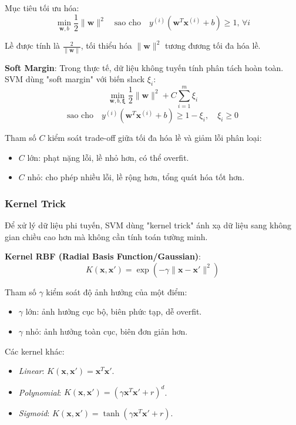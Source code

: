 ﻿\documentclass{article}
\begin{document}
Mục tiêu tối ưu hóa:
\begin{equation}
\min_{\mathbf{w}, b} \frac{1}{2}\|\mathbf{w}\|^2 \quad \text{sao cho} \quad y^{(i)}(\mathbf{w}^T\mathbf{x}^{(i)} + b) \geq 1, \, \forall i
\end{equation}

Lề được tính là $\frac{2}{\|\mathbf{w}\|}$, tối thiểu hóa $\|\mathbf{w}\|^2$ tương đương tối đa hóa lề.

\textbf{Soft Margin}: Trong thực tế, dữ liệu không tuyến tính phân tách hoàn toàn. SVM dùng "soft margin" với biến slack $\xi_i$:
\begin{equation}
\min_{\mathbf{w}, b, \boldsymbol{\xi}} \frac{1}{2}\|\mathbf{w}\|^2 + C\sum_{i=1}^{m}\xi_i
\end{equation}
\begin{equation}
\text{sao cho} \quad y^{(i)}(\mathbf{w}^T\mathbf{x}^{(i)} + b) \geq 1 - \xi_i, \quad \xi_i \geq 0
\end{equation}

Tham số $C$ kiểm soát trade-off giữa tối đa hóa lề và giảm lỗi phân loại:
\begin{itemize}
    \item $C$ lớn: phạt nặng lỗi, lề nhỏ hơn, có thể overfit.
    \item $C$ nhỏ: cho phép nhiều lỗi, lề rộng hơn, tổng quát hóa tốt hơn.
\end{itemize}

\subsubsection*{Kernel Trick}
Để xử lý dữ liệu phi tuyến, SVM dùng "kernel trick" ánh xạ dữ liệu sang không gian chiều cao hơn mà không cần tính toán tường minh.

\textbf{Kernel RBF (Radial Basis Function/Gaussian)}:
\begin{equation}
K(\mathbf{x}, \mathbf{x}') = \exp\left(-\gamma\|\mathbf{x} - \mathbf{x}'\|^2\right)
\end{equation}

Tham số $\gamma$ kiểm soát độ ảnh hưởng của một điểm:
\begin{itemize}
    \item $\gamma$ lớn: ảnh hưởng cục bộ, biên phức tạp, dễ overfit.
    \item $\gamma$ nhỏ: ảnh hưởng toàn cục, biên đơn giản hơn.
\end{itemize}

Các kernel khác:
\begin{itemize}
    \item \textit{Linear}: $K(\mathbf{x}, \mathbf{x}') = \mathbf{x}^T\mathbf{x}'$.
    \item \textit{Polynomial}: $K(\mathbf{x}, \mathbf{x}') = (\gamma\mathbf{x}^T\mathbf{x}' + r)^d$.
    \item \textit{Sigmoid}: $K(\mathbf{x}, \mathbf{x}') = \tanh(\gamma\mathbf{x}^T\mathbf{x}' + r)$.
\end{itemize}
\end{document}
